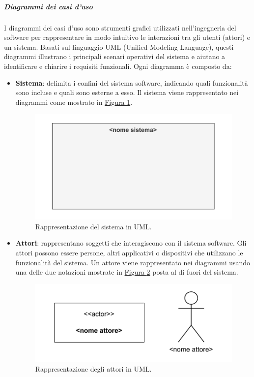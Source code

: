 \subparagraph{Diagrammi dei casi d'uso}
I diagrammi dei casi d'uso sono strumenti grafici utilizzati nell'ingegneria del software per rappresentare in modo intuitivo le interazioni tra gli utenti (attori) e un sistema. Basati sul linguaggio UML (Unified Modeling Language), questi diagrammi illustrano i principali scenari operativi del sistema e aiutano a identificare e chiarire i requisiti funzionali.
Ogni diagramma è composto da:
\begin{itemize}
    \item \textbf{Sistema}: delimita i confini del sistema software, indicando quali funzionalità sono incluse e quali sono esterne a esso.
    Il sistema viene rappresentato nei diagrammi come mostrato in \hyperref[fig:sistema_uml]{Figura \ref{fig:sistema_uml}}.
    \begin{figure}[H]
        \centering
        \includegraphics{Sezioni/ProcessiPrimari/Immagini/sistema_caso_uso.pdf}
        \caption{Rappresentazione del sistema in UML.}
        \label{fig:sistema_uml}
    \end{figure}
    
    \item \textbf{Attori}: rappresentano soggetti che interagiscono con il sistema software. Gli attori possono essere persone, altri applicativi o dispositivi che utilizzano le funzionalità del sistema.
    Un attore viene rappresentato nei diagrammi usando una delle due notazioni mostrate in \hyperref[fig:attori_uml]{Figura \ref{fig:attori_uml}} posta al di fuori del sistema.
    \begin{figure}[H]
        \centering
        \includegraphics{Sezioni/ProcessiPrimari/Immagini/attori_caso_uso.pdf}
        \caption{Rappresentazione degli attori in UML.}
        \label{fig:attori_uml}
    \end{figure}
    

\end{itemize}
